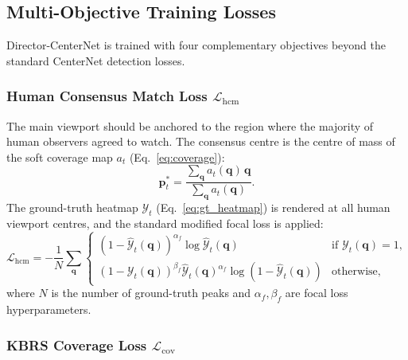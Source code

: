 \documentclass[preprint,12pt]{elsarticle}
\begin{document}
\subsection{Multi-Objective Training Losses}
\label{subsec:losses}

Director-CenterNet is trained with four complementary objectives beyond 
the standard CenterNet detection losses.

\subsubsection{Human Consensus Match Loss $\mathcal{L}_{\text{hcm}}$}

The main viewport should be anchored to the region where the majority of 
human observers agreed to watch. The consensus centre is the centre of mass 
of the soft coverage map $a_t$ (Eq.~\ref{eq:coverage}):
\begin{equation}
  \mathbf{p}^*_t = \frac{\sum_{\mathbf{q}} a_t(\mathbf{q})\,\mathbf{q}}
                         {\sum_{\mathbf{q}} a_t(\mathbf{q})}.
  \label{eq:consensus_center}
\end{equation}
The ground-truth heatmap $\mathcal{Y}_t$ (Eq.~\ref{eq:gt_heatmap}) is 
rendered at all human viewport centres, and the standard modified focal loss 
\cite{law2018cornernet} is applied:
\begin{equation}
  \mathcal{L}_{\text{hcm}} = -\frac{1}{N}\sum_{\mathbf{q}}
    \begin{cases}
      (1-\hat{\mathcal{Y}}_t(\mathbf{q}))^{\alpha_f} 
        \log \hat{\mathcal{Y}}_t(\mathbf{q}) 
        & \text{if } \mathcal{Y}_t(\mathbf{q})=1, \\[4pt]
      (1-\mathcal{Y}_t(\mathbf{q}))^{\beta_f} 
        \hat{\mathcal{Y}}_t(\mathbf{q})^{\alpha_f} 
        \log(1-\hat{\mathcal{Y}}_t(\mathbf{q})) 
        & \text{otherwise,}
    \end{cases}
  \label{eq:hcm_loss}
\end{equation}
where $N$ is the number of ground-truth peaks and $\alpha_f, \beta_f$ are 
focal loss hyperparameters.

\subsubsection{KBRS Coverage Loss $\mathcal{L}_{\text{cov}}$}
\label{subsec:cov_loss}
\end{document}
